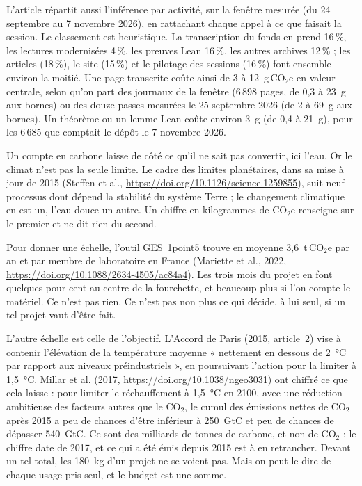 L'article répartit aussi l'inférence par activité, sur la fenêtre mesurée (du 24 septembre
au 7 novembre 2026), en rattachant chaque appel à ce que faisait la session. Le classement
est heuristique. La transcription du fonds en prend 16\,\%, les lectures modernisées
4\,\%, les preuves Lean 16\,\%, les autres archives 12\,\% ; les articles (18\,\%), le
site (15\,\%) et le pilotage des sessions (16\,\%) font ensemble environ la moitié. Une
page transcrite coûte ainsi de 3 à 12~g\,CO$_2$e en valeur centrale, selon qu'on part des
journaux de la fenêtre (6\,898 pages, de 0,3 à 23~g aux bornes) ou des douze passes
mesurées le 25 septembre 2026 (de 2 à 69~g aux bornes). Un théorème ou un lemme Lean coûte
environ 3~g (de 0,4 à 21~g), pour les 6\,685 que comptait le dépôt le 7 novembre 2026.

Un compte en carbone laisse de côté ce qu'il ne sait pas convertir, ici l'eau. Or le
climat n'est pas la seule limite. Le cadre des limites planétaires, dans sa mise à jour
de 2015 (Steffen et al., \url{https://doi.org/10.1126/science.1259855}), suit neuf
processus dont dépend la stabilité du système Terre ; le changement climatique en est un,
l'eau douce un autre. Un chiffre en kilogrammes de CO$_2$e renseigne sur le premier et ne
dit rien du second.

Pour donner une échelle, l'outil GES~1point5 trouve en moyenne 3,6~t\,CO$_2$e par an et
par membre de laboratoire en France (Mariette et al., 2022,
\url{https://doi.org/10.1088/2634-4505/ac84a4}). Les trois mois du projet en font quelques
pour cent au centre de la fourchette, et beaucoup plus si l'on compte le matériel. Ce
n'est pas rien. Ce n'est pas non plus ce qui décide, à lui seul, si un tel projet vaut
d'être fait.

L'autre échelle est celle de l'objectif. L'Accord de Paris (2015, article~2) vise à
contenir l'élévation de la température moyenne « nettement en dessous de 2~°C par rapport
aux niveaux préindustriels », en poursuivant l'action pour la limiter à 1,5~°C. Millar et
al. (2017, \url{https://doi.org/10.1038/ngeo3031}) ont chiffré ce que cela laisse : pour
limiter le réchauffement à 1,5~°C en 2100, avec une réduction ambitieuse des facteurs
autres que le CO$_2$, le cumul des émissions nettes de CO$_2$ après 2015 a peu de chances d'être inférieur à
250~GtC et peu de chances de dépasser 540~GtC. Ce sont des milliards de tonnes de carbone,
et non de CO$_2$ ; le chiffre date de 2017, et ce qui a été émis depuis 2015 est à en
retrancher. Devant un tel total, les 180~kg d'un projet ne se voient pas. Mais on peut le
dire de chaque usage pris seul, et le budget est une somme.

